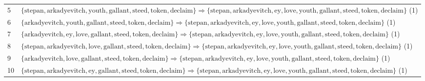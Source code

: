 \begin{appendices}
\begin{longtable}{p{20pt}|p{\dimexpr\textwidth-\tabcolsep-20pt\relax}}
5 & $ \{ \text{stepan},\allowbreak\text{arkadyevitch},\allowbreak\text{youth},\allowbreak\text{gallant},\allowbreak\text{steed},\allowbreak\text{token},\allowbreak\text{declaim} \} \Rightarrow \{ \text{stepan},\allowbreak\text{arkadyevitch},\allowbreak\text{ey},\allowbreak\text{love},\allowbreak\text{youth},\allowbreak\text{gallant},\allowbreak\text{steed},\allowbreak\text{token},\allowbreak\text{declaim} \} $ (1) \\
6 & $ \{ \text{arkadyevitch},\allowbreak\text{youth},\allowbreak\text{gallant},\allowbreak\text{steed},\allowbreak\text{token},\allowbreak\text{declaim} \} \Rightarrow \{ \text{stepan},\allowbreak\text{arkadyevitch},\allowbreak\text{ey},\allowbreak\text{love},\allowbreak\text{youth},\allowbreak\text{gallant},\allowbreak\text{steed},\allowbreak\text{token},\allowbreak\text{declaim} \} $ (1) \\
7 & $ \{ \text{arkadyevitch},\allowbreak\text{ey},\allowbreak\text{love},\allowbreak\text{gallant},\allowbreak\text{steed},\allowbreak\text{token},\allowbreak\text{declaim} \} \Rightarrow \{ \text{stepan},\allowbreak\text{arkadyevitch},\allowbreak\text{ey},\allowbreak\text{love},\allowbreak\text{youth},\allowbreak\text{gallant},\allowbreak\text{steed},\allowbreak\text{token},\allowbreak\text{declaim} \} $ (1) \\
8 & $ \{ \text{stepan},\allowbreak\text{arkadyevitch},\allowbreak\text{love},\allowbreak\text{gallant},\allowbreak\text{steed},\allowbreak\text{token},\allowbreak\text{declaim} \} \Rightarrow \{ \text{stepan},\allowbreak\text{arkadyevitch},\allowbreak\text{ey},\allowbreak\text{love},\allowbreak\text{youth},\allowbreak\text{gallant},\allowbreak\text{steed},\allowbreak\text{token},\allowbreak\text{declaim} \} $ (1) \\
9 & $ \{ \text{arkadyevitch},\allowbreak\text{love},\allowbreak\text{gallant},\allowbreak\text{steed},\allowbreak\text{token},\allowbreak\text{declaim} \} \Rightarrow \{ \text{stepan},\allowbreak\text{arkadyevitch},\allowbreak\text{ey},\allowbreak\text{love},\allowbreak\text{youth},\allowbreak\text{gallant},\allowbreak\text{steed},\allowbreak\text{token},\allowbreak\text{declaim} \} $ (1) \\
10 & $ \{ \text{stepan},\allowbreak\text{arkadyevitch},\allowbreak\text{ey},\allowbreak\text{gallant},\allowbreak\text{steed},\allowbreak\text{token},\allowbreak\text{declaim} \} \Rightarrow \{ \text{stepan},\allowbreak\text{arkadyevitch},\allowbreak\text{ey},\allowbreak\text{love},\allowbreak\text{youth},\allowbreak\text{gallant},\allowbreak\text{steed},\allowbreak\text{token},\allowbreak\text{declaim} \} $ (1) \\

\end{longtable}
\end{appendices}
